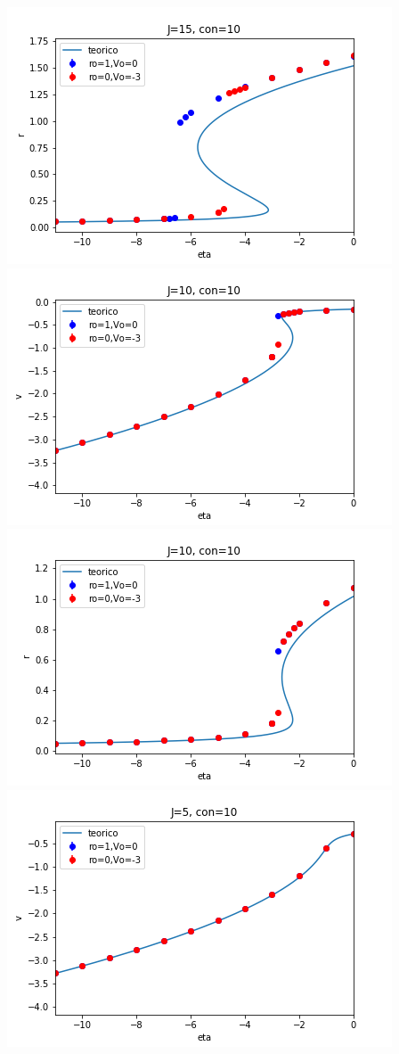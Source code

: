 \documentclass[a4paper]{article}
\begin{document}
\includegraphics[scale=0.7]{r_vs_eta_J15_con10_2.png}\\
\includegraphics[scale=0.7]{v_vs_eta_J10_con10_2.png}\\
\includegraphics[scale=0.7]{r_vs_eta_J10_con10_2.png}\\
\includegraphics[scale=0.7]{v_vs_eta_J5_con10_2.png}\\
\end{document}
